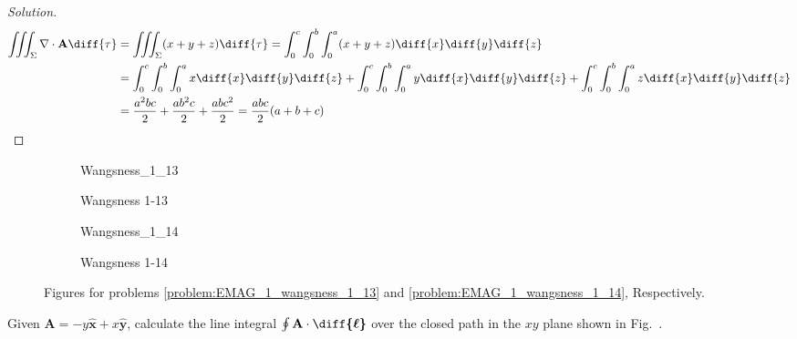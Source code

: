 \documentclass[crop=false,class=book,oneside]{standalone}
\begin{document}
\begin{proof}[Solution]
\begin{align*}
                    \iiint_{\Sigma}\nabla\cdot\mathbf{A}\diff{\tau}
                    &=\iiint_{\Sigma}(x+y+z)\diff{\tau}
                    =\int_{0}^{c}\int_{0}^{b}\int_{0}^{a}
                    (x+y+z)\diff{x}\diff{y}\diff{z}\\
                    &=\int_{0}^{c}\int_{0}^{b}\int_{0}^{a}
                    x\diff{x}\diff{y}\diff{z}
                    +\int_{0}^{c}\int_{0}^{b}\int_{0}^{a}
                    y\diff{x}\diff{y}\diff{z}
                    +\int_{0}^{c}\int_{0}^{b}\int_{0}^{a}
                    z\diff{x}\diff{y}\diff{z}\\
                    &=\frac{a^{2}bc}{2}+\frac{ab^{2}c}{2}
                    +\frac{abc^{2}}{2}=\frac{abc}{2}(a+b+c)
                \end{align*}
            \end{proof}
            \begin{figure}[H]
                \centering
                \captionsetup{type=figure}
                \begin{subfigure}[b]{0.49\textwidth}
                    \centering
                    \captionsetup{type=figure}
                    {Wangsness_1_13}
                \caption{Wangsness 1-13}
                \label{fig:EMAG_1_wangsness_1_13_region_of_integration}
                \end{subfigure}
                \begin{subfigure}[b]{0.49\textwidth}
                    \centering
                    \captionsetup{type=figure}
                    {Wangsness_1_14}
                    \caption{Wangsness 1-14}
                    \label{fig:EMAG_1_wangsness_1_14}
                \end{subfigure}
                \caption[Figures for Wangsness 1-13 and 1-14]
                {Figures for problems
                \ref{problem:EMAG_1_wangsness_1_13} and
                \ref{problem:EMAG_1_wangsness_1_14}, Respectively.}
            \end{figure}
            \begin{problem}[Wangsness 1-14]
                \label{problem:EMAG_1_wangsness_1_14}
                Given $\mathbf{A}=-y\hat{\mathbf{x}}+x\hat{\mathbf{y}}$,
                calculate the line integral
                $\oint\mathbf{A}\cdot\boldsymbol{\diff{\ell}}$
                over the closed path in the $xy$
                plane shown in
                Fig.~.
            \end{problem}
\end{document}

